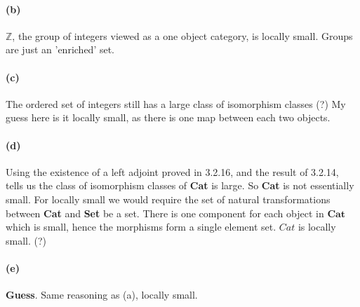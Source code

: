 \documentclass{article}
\begin{document}
\paragraph{(b)}
$\mathds{Z}$, the group of integers viewed as a one object category, is locally small. Groups are just an 'enriched' set.
\paragraph{(c)}
The ordered set of integers still has a large class of isomorphism classes (?) My guess here is it locally small, as there is one map between each two objects.
\paragraph{(d)} Using the existence of a left adjoint proved in 3.2.16, and the result of 3.2.14, tells us the class of isomorphism classes of \textbf{Cat} is large. So \textbf{Cat} is not essentially small. For locally small we would require the set of natural transformations between \textbf{Cat} and \textbf{Set} be a set. There is one component for each object in $\textbf{Cat}$ which is small, hence the morphisms form a single element set. $Cat$ is locally small. (?)
\paragraph{(e)} \textbf{Guess}. Same reasoning as (a), locally small.
\end{document}
